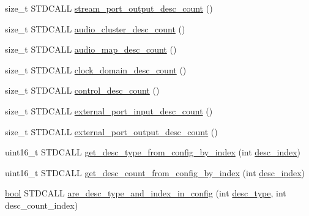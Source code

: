 \begin{DoxyCompactItemize}
size\+\_\+t S\+T\+D\+C\+A\+LL \hyperlink{classavdecc__lib_1_1configuration__descriptor__imp_ac6a024910e279ac710a4e3141531950e}{stream\+\_\+port\+\_\+output\+\_\+desc\+\_\+count} ()
\item 
size\+\_\+t S\+T\+D\+C\+A\+LL \hyperlink{classavdecc__lib_1_1configuration__descriptor__imp_addc36a2c3b2eb91c9701814c3f3e78d3}{audio\+\_\+cluster\+\_\+desc\+\_\+count} ()
\item 
size\+\_\+t S\+T\+D\+C\+A\+LL \hyperlink{classavdecc__lib_1_1configuration__descriptor__imp_ab7007d8c933ac7f771c45dddd4aed8d3}{audio\+\_\+map\+\_\+desc\+\_\+count} ()
\item 
size\+\_\+t S\+T\+D\+C\+A\+LL \hyperlink{classavdecc__lib_1_1configuration__descriptor__imp_a906901d5b09439e47043f3ff42154dec}{clock\+\_\+domain\+\_\+desc\+\_\+count} ()
\item 
size\+\_\+t S\+T\+D\+C\+A\+LL \hyperlink{classavdecc__lib_1_1configuration__descriptor__imp_ab69b542553e589d672ab0a76e96395a9}{control\+\_\+desc\+\_\+count} ()
\item 
size\+\_\+t S\+T\+D\+C\+A\+LL \hyperlink{classavdecc__lib_1_1configuration__descriptor__imp_af7a6b37d6b7706f3748253f45dfe9784}{external\+\_\+port\+\_\+input\+\_\+desc\+\_\+count} ()
\item 
size\+\_\+t S\+T\+D\+C\+A\+LL \hyperlink{classavdecc__lib_1_1configuration__descriptor__imp_a494a824f9352f2cad0be58ad4845b8c0}{external\+\_\+port\+\_\+output\+\_\+desc\+\_\+count} ()
\item 
uint16\+\_\+t S\+T\+D\+C\+A\+LL \hyperlink{classavdecc__lib_1_1configuration__descriptor__imp_a55de5771113e11150c5253d0b0742e2b}{get\+\_\+desc\+\_\+type\+\_\+from\+\_\+config\+\_\+by\+\_\+index} (int \hyperlink{classavdecc__lib_1_1descriptor__base__imp_a2bbd0d8f32f687ca36aaa543c06f764c}{desc\+\_\+index})
\item 
uint16\+\_\+t S\+T\+D\+C\+A\+LL \hyperlink{classavdecc__lib_1_1configuration__descriptor__imp_a3f48b643492c483d2024b5b0b71dbf8e}{get\+\_\+desc\+\_\+count\+\_\+from\+\_\+config\+\_\+by\+\_\+index} (int \hyperlink{classavdecc__lib_1_1descriptor__base__imp_a2bbd0d8f32f687ca36aaa543c06f764c}{desc\+\_\+index})
\item 
\hyperlink{avb__gptp_8h_af6a258d8f3ee5206d682d799316314b1}{bool} S\+T\+D\+C\+A\+LL \hyperlink{classavdecc__lib_1_1configuration__descriptor__imp_a6d52f802ef87851122e4c571d4cf3fc1}{are\+\_\+desc\+\_\+type\+\_\+and\+\_\+index\+\_\+in\+\_\+config} (int \hyperlink{classavdecc__lib_1_1descriptor__base__imp_a9dada313309522d04f1e52fe887442b4}{desc\+\_\+type}, int desc\+\_\+count\+\_\+index)

\end{DoxyCompactItemize}
